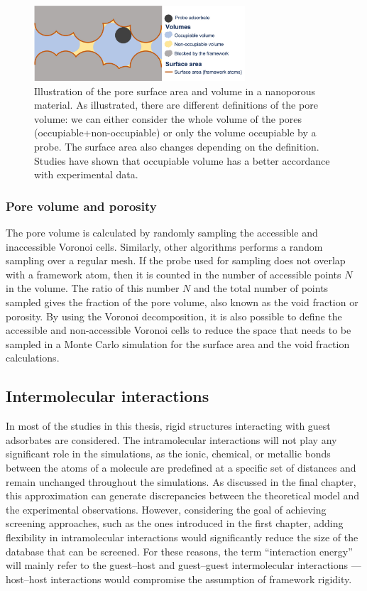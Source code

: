 \documentclass[main.tex]{subfiles}
\begin{document}
\begin{figure}[ht!]
  \centering
  \includegraphics[width=0.7\textwidth]{figures/1-screening/Pore_descriptors.jpg}
  \caption{Illustration of the pore surface area and volume in a nanoporous material. As illustrated, there are different definitions of the pore volume: we can either consider the whole volume of the pores (occupiable+non-occupiable) or only the volume occupiable by a probe. The surface area also changes depending on the definition. Studies have shown that occupiable volume has a better accordance with experimental data.\autocite{vol_Ongari2017}}\label{fgr:pores}
\end{figure}

\subsubsection{Pore volume and porosity}

The pore volume is calculated by randomly sampling the accessible and inaccessible Voronoi cells. Similarly, other algorithms performs a random sampling over a regular mesh. If the probe used for sampling does not overlap with a framework atom, then it is counted in the number of accessible points $N$ in the volume. The ratio of this number $N$ and the total number of points sampled gives the fraction of the pore volume, also known as the void fraction or porosity. By using the Voronoi decomposition, it is also possible to define the accessible and non-accessible Voronoi cells to reduce the space that needs to be sampled in a Monte Carlo simulation for the surface area and the void fraction calculations.


\subsection{Intermolecular interactions}\label{sct:interaction}

In most of the studies in this thesis, rigid structures interacting with guest adsorbates are considered. The intramolecular interactions will not play any significant role in the simulations, as the ionic, chemical, or metallic bonds between the atoms of a molecule are predefined at a specific set of distances and remain unchanged throughout the simulations. As discussed in the final chapter, this approximation can generate discrepancies between the theoretical model and the experimental observations. However, considering the goal of achieving screening approaches, such as the ones introduced in the first chapter, adding flexibility in intramolecular interactions would significantly reduce the size of the database that can be screened. For these reasons, the term ``interaction energy'' will mainly refer to the guest--host and guest--guest intermolecular interactions --- host--host interactions would compromise the assumption of framework rigidity.
\end{document}
